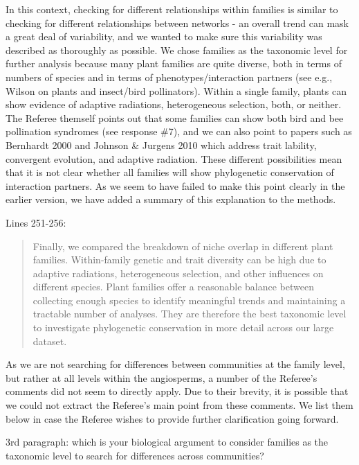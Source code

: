 \documentclass[12pt]{letter}
\newenvironment{refquote}{\bigskip \begin{it}}{\end{it}\smallskip}
\begin{document}
		In this context, checking for different relationships within families is similar to checking for different relationships between networks - an overall trend can mask a great deal of variability, and we wanted to make sure this variability was described as thoroughly as possible. We chose families as the taxonomic level for further analysis because many plant families are quite diverse, both in terms of numbers of species and in terms of phenotypes/interaction partners (see e.g., Wilson on plants and insect/bird pollinators). Within a single family, plants can show evidence of adaptive radiations, heterogeneous selection, both, or neither. The Referee themself points out that some families can show both bird and bee pollination syndromes (see response \#7), and we can also point to papers such as Bernhardt 2000 and Johnson \& Jurgens 2010 which address trait lability, convergent evolution, and adaptive radiation. These different possibilities mean that it is not clear whether all families will show phylogenetic conservation of interaction partners. 
		As we seem to have failed to make this point clearly in the earlier version, we have added a summary of this explanation to the methods. 


		Lines 251-256:

		\begin{quotation}

			Finally, we compared the breakdown of niche overlap in different plant families.
			Within-family genetic and trait diversity can be high due to adaptive radiations, heterogeneous selection, and other influences on different species. 
			Plant families offer a reasonable balance between collecting enough species to identify meaningful trends and maintaining a tractable number of analyses. 
			They are therefore the best taxonomic level to investigate phylogenetic conservation in more detail across our large dataset.

		\end{quotation}


		As we are not searching for differences between communities at the family level, but rather at all levels within the angiosperms, a number of the Referee's comments did not seem to directly apply. Due to their brevity, it is possible that we could not extract the Referee's main point from these comments. We list them below in case the Referee wishes to provide further clarification going forward.


		\begin{refquote}
		3rd paragraph:  which is your biological argument to consider families as the taxonomic level to search for differences across communities?
		\end{refquote}
\end{document}
